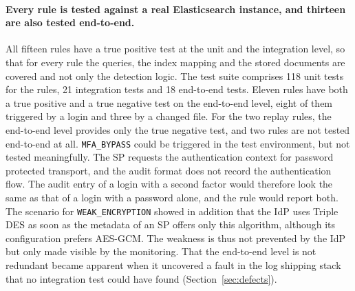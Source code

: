 \documentclass[../main.tex]{subfiles}
\begin{document}
\paragraph{Every rule is tested against a real Elasticsearch instance, and thirteen are also tested end-to-end.} 
All fifteen rules have a true positive test at the unit and the integration level, so that for 
every rule the queries, the index mapping and the stored documents are covered and not only the 
detection logic. 
The test suite comprises 118 unit tests for the rules, 21 integration tests and 18 end-to-end 
tests. 
Eleven rules have both a true positive and a true negative test on the end-to-end level, eight of 
them triggered by a login and three by a changed file. 
For the two replay rules, the end-to-end level provides only the true negative test, and two rules 
are not tested end-to-end at all. 
\texttt{MFA\_\allowbreak{}BYPASS} could be triggered in the test environment, but not tested 
meaningfully. 
The SP requests the authentication context for password protected transport, and the audit format 
does not record the authentication flow. 
The audit entry of a login with a second factor would therefore look the same as that of a login 
with a password alone, and the rule would report both. 
The scenario for \texttt{WEAK\_\allowbreak{}ENCRYPTION} showed in addition that the IdP uses Triple DES 
as soon as the metadata of an SP offers only this algorithm, although its configuration prefers 
AES-GCM. 
The weakness is thus not prevented by the IdP but only made visible by the monitoring. 
That the end-to-end level is not redundant became apparent when it uncovered a fault in the log 
shipping stack that no integration test could have found (Section~\ref{sec:defects}).
\end{document}
